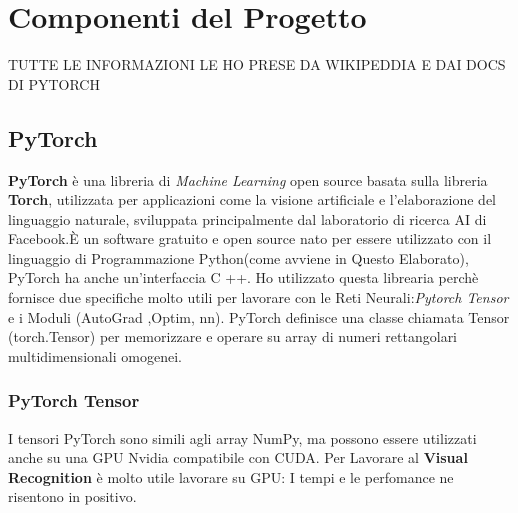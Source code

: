 \chapter{Componenti del Progetto}\label{ch:chapter2}
TUTTE LE INFORMAZIONI LE HO PRESE DA WIKIPEDDIA E DAI DOCS DI PYTORCH
\section{PyTorch}
\textbf{PyTorch} è una libreria di \textit{Machine Learning} open source basata sulla libreria \textbf{Torch}, utilizzata per applicazioni come la visione artificiale e l'elaborazione del linguaggio naturale, sviluppata principalmente dal laboratorio di ricerca AI di Facebook.È un software gratuito e open source nato  per essere utilizzato con il linguaggio di Programmazione Python(come avviene in Questo Elaborato), PyTorch ha anche un'interfaccia C ++.
Ho utilizzato questa librearia perchè fornisce due specifiche molto utili per lavorare con le Reti Neurali:\textit{Pytorch Tensor} e i Moduli (AutoGrad ,Optim, nn).
PyTorch definisce una classe chiamata Tensor (torch.Tensor) per memorizzare e operare su array di numeri rettangolari multidimensionali omogenei.
\newpage
\subsection{PyTorch Tensor}
I tensori PyTorch sono simili agli array NumPy, ma possono essere utilizzati anche su una GPU Nvidia compatibile con CUDA. Per Lavorare al \textbf{Visual Recognition} è molto utile lavorare su GPU: I tempi e le perfomance ne risentono in positivo.
